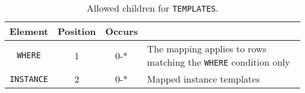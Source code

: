 \begin{table}[!htbp]
  \small
  \centering
  \begin{tabulary}{\linewidth}{|c |c |c|J|}
    \hline 
        \textbf{Element} &
        \textbf{Position} &
        \textbf{Occurs} &
        \\
    \hline
    \hline  
        \texttt{WHERE}  &        
        1 &           
        0-* &
        The mapping applies to rows matching the \texttt{WHERE} condition only\\
    \hline    
        \texttt{INSTANCE} &           
        2 &           
        0-* &
        Mapped instance templates\\
    \hline 
  \end{tabulary}
  \caption{Allowed children for \texttt{TEMPLATES}.} 
  \label{tbl:templates-children}
\end{table}
